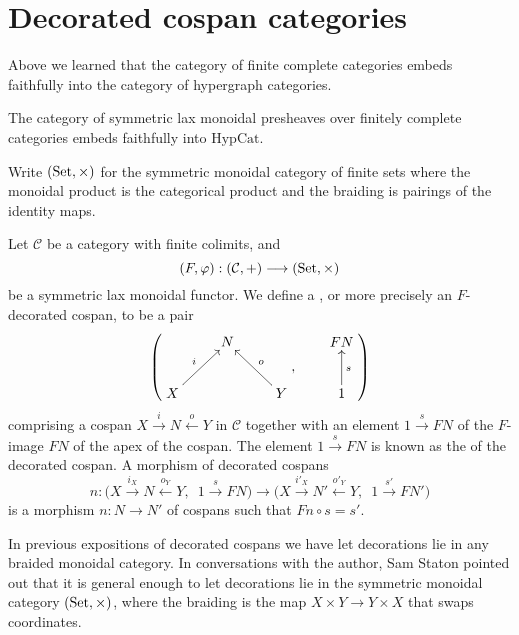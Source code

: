 \section{Decorated cospan categories} \label{sec:dcc}

Above we learned that the category of finite complete categories embeds
faithfully into the category of hypergraph categories.

\begin{theorem}
  The category of symmetric lax monoidal presheaves over finitely complete categories embeds
  faithfully into $\mathrm{HypCat}$.
\end{theorem}


Write $(\mathrm{Set},\times)$ for the symmetric monoidal category of finite sets where
the monoidal product is the categorical product and the braiding is pairings of
the identity maps.



\begin{definition} \label{def:fcospanss}
  Let $\mathcal C$ be a category with finite colimits, and
  \[
    (F,\varphi): (\mathcal C,+) \longrightarrow (\mathrm{Set}, \times)
  \]
  be a symmetric lax monoidal functor. We define a , or more
  precisely an $F$-decorated cospan, to be a pair 
  \[
    \left(
    \begin{aligned}
      \xymatrix{
	& N \\  
	X \ar[ur]^{i} && Y \ar[ul]_{o}
      }
    \end{aligned}
    ,
    \qquad
    \begin{aligned}
      \xymatrix{
	FN \\
	1 \ar[u]_{s}
      }
    \end{aligned}
    \right)
  \]
  comprising a cospan $X \stackrel{i}\rightarrow N \stackrel{o}\leftarrow Y$ in
  $\mathcal C$ together with an element $1 \stackrel{s}\rightarrow FN$ of
  the $F$-image $FN$ of the apex of the cospan. The element $1
  \stackrel{s}\rightarrow FN$ is known as the  of the decorated
  cospan. A morphism of decorated cospans 
  \[
    n: \big(X \stackrel{i_X}\longrightarrow N \stackrel{o_Y}\longleftarrow
    Y,\enspace 1 \stackrel{s}\longrightarrow FN\big) \longrightarrow \big(X
    \stackrel{i'_X}\longrightarrow N' \stackrel{o'_Y}\longleftarrow Y,\enspace 1
    \stackrel{s'}\longrightarrow FN'\big)
  \]
  is a morphism $n: N \to N'$ of cospans such that $Fn \circ s = s'$.
\end{definition}

In previous expositions of decorated cospans we have let decorations lie in any
braided monoidal category. In conversations with the author, Sam Staton pointed
out that it is general enough to let decorations lie in the symmetric monoidal
category $(\mathrm{Set},\times)$, where the braiding is the map $X \times Y \to Y \times
X$ that swaps coordinates. 

